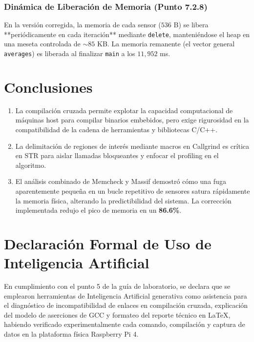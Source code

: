 \documentclass[11pt,a4paper]{article}
\begin{document}
\subsubsection{Dinámica de Liberación de Memoria (Punto 7.2.8)}
En la versión corregida, la memoria de cada sensor ($536$ B) se libera **periódicamente en cada iteración** mediante \texttt{delete}, manteniéndose el heap en una meseta controlada de $\sim 85$ KB. La memoria remanente (el vector general \texttt{averages}) es liberada al finalizar \texttt{main} a los $11{,}952$ ms.

\section{Conclusiones}
\begin{enumerate}
    \item La compilación cruzada permite explotar la capacidad computacional de máquinas host para compilar binarios embebidos, pero exige rigurosidad en la compatibilidad de la cadena de herramientas y bibliotecas C/C++.
    \item La delimitación de regiones de interés mediante macros en Callgrind es crítica en STR para aislar llamadas bloqueantes y enfocar el profiling en el algoritmo.
    \item El análisis combinado de Memcheck y Massif demostró cómo una fuga aparentemente pequeña en un bucle repetitivo de sensores satura rápidamente la memoria física, alterando la predictibilidad del sistema. La corrección implementada redujo el pico de memoria en un \textbf{86.6\%}.
\end{enumerate}

\section*{Declaración Formal de Uso de Inteligencia Artificial}
En cumplimiento con el punto 5 de la guía de laboratorio, se declara que se emplearon herramientas de Inteligencia Artificial generativa como asistencia para el diagnóstico de incompatibilidad de enlaces en compilación cruzada, explicación del modelo de aserciones de GCC y formateo del reporte técnico en \LaTeX, habiendo verificado experimentalmente cada comando, compilación y captura de datos en la plataforma física Raspberry Pi 4.
\end{document}
